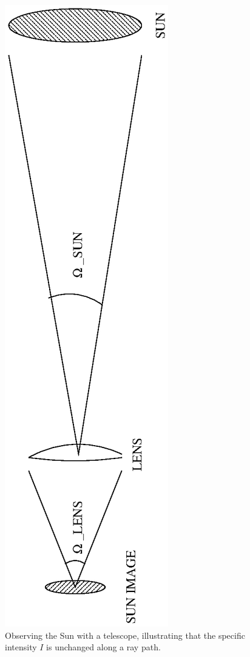 \documentclass[psfig,preprint]{aastex}
\begin{document}
\begin{figure}[h!]
\begin{center}
\includegraphics[scale=.55, angle=-90]{fount1.ps}
\end{center}
\caption{Observing the Sun with a telescope, illustrating that the
specific intensity $I$ is unchanged along a ray path.\label{fount1}}
\end{figure}
\end{document}
